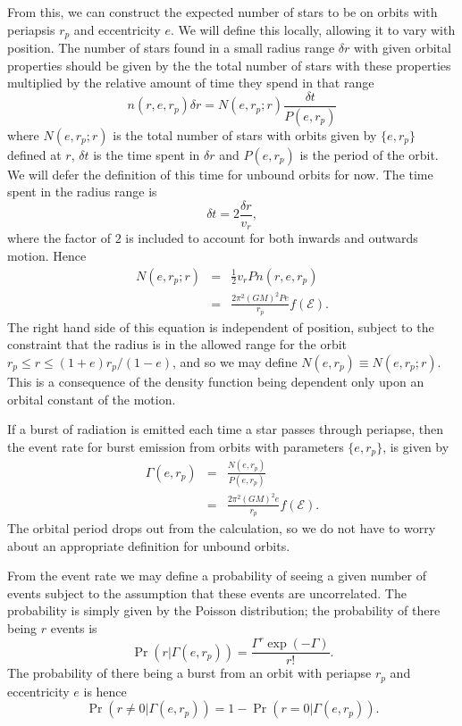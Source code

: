 \documentclass[useAMS,usedcolumn,usegraphicx,usenatbib]{mn2e}
\newcommand{\recip}[1]{\ensuremath{\frac{1}{#1}}}
\begin{document}
From this, we can construct the expected number of stars to be on orbits with periapsis $r_p$ and eccentricity $e$. We will define this locally, allowing it to vary with position. The number of stars found in a small radius range $\delta r$ with given orbital properties should be given by the the total number of stars with these properties multiplied by the relative amount of time they spend in that range
\begin{equation}
n(r, e, r_p)\delta r = N(e, r_p; r)\frac{\delta t}{P(e, r_p)}
\end{equation}
where $N(e, r_p; r)$ is the total number of stars with orbits given by $\{e, r_p\}$ defined at $r$, $\delta t$ is the time spent in $\delta r$ and $P(e, r_p)$ is the period of the orbit. We will defer the definition of this time for unbound orbits for now. The time spent in the radius range is
\begin{equation}
\delta t = 2\frac{\delta r}{v_r},
\end{equation}
where the factor of $2$ is included to account for both inwards and outwards motion. Hence
\begin{eqnarray}
N(e, r_p; r) & = & \recip{2} v_r P n(r, e, r_p)\\
 & = & \frac{2\pi^2(GM)^2 P e}{r_p}f(\mathcal{E}).
\end{eqnarray}
The right hand side of this equation is independent of position, subject to the constraint that the radius is in the allowed range for the orbit $r_p \leq r \leq (1+e)r_p/(1-e)$, and so we may define $N(e, r_p) \equiv N(e, r_p; r)$. This is a consequence of the density function being dependent only upon an orbital constant of the motion.

If a burst of radiation is emitted each time a star passes through periapse, then the event rate for burst emission from orbits with parameters $\{e, r_p\}$, is given by
\begin{eqnarray}
\Gamma(e, r_p) & = & \frac{N(e, r_p)}{P(e, r_p)}\\
 & = & \frac{2\pi^2(GM)^2 e}{r_p}f(\mathcal{E}).
\label{eq:Gamma}
\end{eqnarray}
The orbital period drops out from the calculation, so we do not have to worry about an appropriate definition for unbound orbits.

From the event rate we may define a probability of seeing a given number of events subject to the assumption that these events are uncorrelated. The probability is simply given by the Poisson distribution; the probability of there being $r$ events is
\begin{equation}
\Pr(r|\Gamma(e, r_p)) = \frac{\Gamma^r\exp(-\Gamma)}{r!}.
\end{equation}
The probability of there being a burst from an orbit with periapse $r_p$ and eccentricity $e$ is hence
\begin{equation}
\Pr(r \neq 0|\Gamma(e, r_p)) = 1 - \Pr(r = 0|\Gamma(e, r_p)).
\end{equation}
\end{document}
